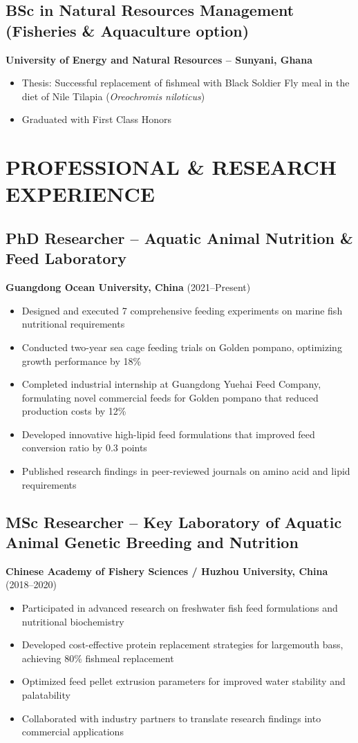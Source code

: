 \documentclass[11pt,a4paper]{article}
\begin{document}
\subsection{BSc in Natural Resources Management (Fisheries \& Aquaculture option)}
\textbf{University of Energy and Natural Resources – Sunyani, Ghana}
\begin{itemize}[leftmargin=*,noitemsep]
    \item Thesis: Successful replacement of fishmeal with Black Soldier Fly meal in the diet of Nile Tilapia (\textit{Oreochromis niloticus})
    \item Graduated with First Class Honors
\end{itemize}

\section{PROFESSIONAL \& RESEARCH EXPERIENCE}

\subsection{PhD Researcher – Aquatic Animal Nutrition \& Feed Laboratory}
\textbf{Guangdong Ocean University, China} \hfill (2021–Present)
\begin{itemize}[leftmargin=*,noitemsep]
    \item Designed and executed 7 comprehensive feeding experiments on marine fish nutritional requirements
    \item Conducted two-year sea cage feeding trials on Golden pompano, optimizing growth performance by 18\%
    \item Completed industrial internship at Guangdong Yuehai Feed Company, formulating novel commercial feeds for Golden pompano that reduced production costs by 12\%
    \item Developed innovative high-lipid feed formulations that improved feed conversion ratio by 0.3 points
    \item Published research findings in peer-reviewed journals on amino acid and lipid requirements
\end{itemize}

\subsection{MSc Researcher – Key Laboratory of Aquatic Animal Genetic Breeding and Nutrition}
\textbf{Chinese Academy of Fishery Sciences / Huzhou University, China} \hfill (2018–2020)
\begin{itemize}[leftmargin=*,noitemsep]
    \item Participated in advanced research on freshwater fish feed formulations and nutritional biochemistry
    \item Developed cost-effective protein replacement strategies for largemouth bass, achieving 80\% fishmeal replacement
    \item Optimized feed pellet extrusion parameters for improved water stability and palatability
    \item Collaborated with industry partners to translate research findings into commercial applications
\end{itemize}
\end{document}

